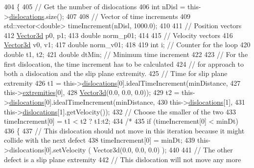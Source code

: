 \begin{DoxyCode}
404 \{
405   \textcolor{comment}{// Get the number of dislocations}
406   \textcolor{keywordtype}{int} nDisl = this->\hyperlink{classSlipPlane_ad92c7c409f7e161db449528389180910}{dislocations}.size();
407   
408   \textcolor{comment}{// Vector of time increments}
409   std::vector<double> timeIncrement(nDisl, 1000.0);
410    
411   \textcolor{comment}{// Position vectors}
412   \hyperlink{classVector3d}{Vector3d} p0, p1;
413   \textcolor{keywordtype}{double} norm\_p01;
414 
415   \textcolor{comment}{// Velocity vectors}
416   \hyperlink{classVector3d}{Vector3d} v0, v1;
417   \textcolor{keywordtype}{double} norm\_v01;
418 
419   \textcolor{keywordtype}{int} i;         \textcolor{comment}{// Counter for the loop}
420   \textcolor{keywordtype}{double} t1, t2;
421   \textcolor{keywordtype}{double} dtMin;  \textcolor{comment}{// Minimum time increment}
422 
423   \textcolor{comment}{// For the first dislocation, the time increment has to be calculated}
424   \textcolor{comment}{// for approach to both a dislocation and the slip plane extremity.}
425   \textcolor{comment}{// Time for slip plane extremity}
426   t1 = this->\hyperlink{classSlipPlane_ad92c7c409f7e161db449528389180910}{dislocations}[0].idealTimeIncrement(minDistance,
427                                                 this->\hyperlink{classSlipPlane_abbdbe6ed805faf3777b54ff55a9c089c}{extremities}[0],
428                                                 \hyperlink{classVector3d}{Vector3d}(0.0, 0.0, 0.0));
429   t2 = this->\hyperlink{classSlipPlane_ad92c7c409f7e161db449528389180910}{dislocations}[0].idealTimeIncrement(minDistance,
430                                                 this->\hyperlink{classSlipPlane_ad92c7c409f7e161db449528389180910}{dislocations}[1],
431                                                 this->\hyperlink{classSlipPlane_ad92c7c409f7e161db449528389180910}{dislocations}[1].getVelocity());
432   \textcolor{comment}{// Choose the smaller of the two}
433   timeIncrement[0] = t1 < t2 ? t1:t2;
434   \textcolor{comment}{/*}
435 \textcolor{comment}{    if (timeIncrement[0] < minDt)}
436 \textcolor{comment}{    \{}
437 \textcolor{comment}{    // This dislocation should not move in this iteration because it might collide with the next defect}
438 \textcolor{comment}{    timeIncrement[0] = minDt;}
439 \textcolor{comment}{    this->dislocations[0].setVelocity ( Vector3d(0.0, 0.0, 0.0) );}
440 \textcolor{comment}{}
441 \textcolor{comment}{    // The other defect is a slip plane extremity}
442 \textcolor{comment}{    // This dislocation will not move any more}

\end{DoxyCode}
